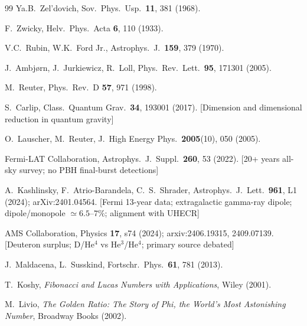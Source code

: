\documentclass[12pt,a4paper]{article}
\begin{document}
\begin{thebibliography}{99}
 Ya.B.~Zel'dovich, Sov.\ Phys.\ Usp.\ \textbf{11}, 381 (1968).


 F.~Zwicky, Helv.\ Phys.\ Acta \textbf{6}, 110 (1933).

 V.C.~Rubin, W.K.~Ford Jr., Astrophys.\ J.\ \textbf{159}, 379 (1970).


 J.~Ambj\o{}rn, J.~Jurkiewicz, R.~Loll, Phys.\ Rev.\ Lett.\ \textbf{95}, 171301 (2005).

 M.~Reuter, Phys.\ Rev.\ D \textbf{57}, 971 (1998).

 S.~Carlip, Class.\ Quantum Grav.\ \textbf{34}, 193001 (2017). [Dimension and dimensional reduction in quantum gravity]

 O.~Lauscher, M.~Reuter, J.\ High Energy Phys.\ \textbf{2005}(10), 050 (2005).


 Fermi-LAT Collaboration, Astrophys.\ J.\ Suppl.\ \textbf{260}, 53 (2022). [20+ years all-sky survey; no PBH final-burst detections]


 A.~Kashlinsky, F.~Atrio-Barandela, C.~S.~Shrader, Astrophys.\ J.\ Lett.\ \textbf{961}, L1 (2024); arXiv:2401.04564. [Fermi 13-year data; extragalactic gamma-ray dipole; dipole/monopole $\simeq 6.5$--$7\%$; alignment with UHECR]

 AMS Collaboration, Physics \textbf{17}, s74 (2024); arxiv:2406.19315, 2409.07139. [Deuteron surplus; D/He${}^4$ vs He${}^3$/He${}^4$; primary source debated]


 J.~Maldacena, L.~Susskind, Fortschr.\ Phys.\ \textbf{61}, 781 (2013).


 T.~Koshy, \textit{Fibonacci and Lucas Numbers with Applications}, Wiley (2001).

 M.~Livio, \textit{The Golden Ratio: The Story of Phi, the World's Most Astonishing Number}, Broadway Books (2002).


\end{thebibliography}
\end{document}

